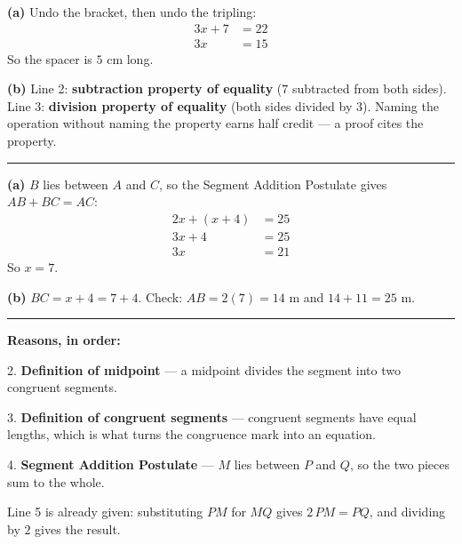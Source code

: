 \documentclass[12pt]{article}
\begin{document}



\textbf{(a)} Undo the bracket, then undo the tripling:
\begin{align*}
  3x + 7 &= 22 \\
  3x &= 15
\end{align*}
So the spacer is $5$ cm long. 

\textbf{(b)} Line 2: \textbf{subtraction property of equality} ($7$ subtracted from both sides). Line 3: \textbf{division property of equality} (both sides divided by $3$). Naming the operation without naming the property earns half credit --- a proof cites the property.

\vspace{0.2cm}\noindent\rule{\linewidth}{0.2pt}


\textbf{(a)} $B$ lies between $A$ and $C$, so the Segment Addition Postulate gives $AB + BC = AC$:
\begin{align*}
  2x + (x + 4) &= 25 \\
  3x + 4 &= 25 \\
  3x &= 21
\end{align*}
So $x = 7$. 

\textbf{(b)} $BC = x + 4 = 7 + 4$. Check: $AB = 2(7) = 14$ m and $14 + 11 = 25$ m. 

\vspace{0.2cm}\noindent\rule{\linewidth}{0.2pt}


\textbf{Reasons, in order:}

2. \textbf{Definition of midpoint} --- a midpoint divides the segment into two congruent segments.

3. \textbf{Definition of congruent segments} --- congruent segments have equal lengths, which is what turns the congruence mark into an equation.

4. \textbf{Segment Addition Postulate} --- $M$ lies between $P$ and $Q$, so the two pieces sum to the whole.

Line 5 is already given: substituting $PM$ for $MQ$ gives $2\,PM = PQ$, and dividing by $2$ gives the result.
\end{document}
